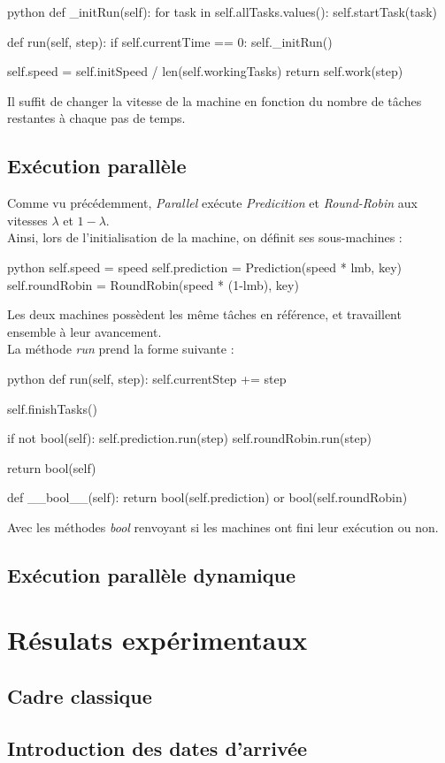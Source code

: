 \documentclass[12pt]{article}
\begin{document}
\begin{mintedbox}{python}
    def _initRun(self):
        for task in self.allTasks.values():
            self.startTask(task)
            
    def run(self, step):
        if self.currentTime == 0:
            self._initRun()

        self.speed = self.initSpeed / len(self.workingTasks)
        return self.work(step)
\end{mintedbox}

Il suffit de changer la vitesse de la machine en fonction du nombre de tâches restantes à chaque pas de temps.

\subsection{Exécution parallèle}

Comme vu précédemment, \emph{Parallel} exécute \emph{Predicition} et \emph{Round-Robin} aux vitesses $\lambda$ et $1 - \lambda$. \\

Ainsi, lors de l'initialisation de la machine, on définit ses sous-machines :
\begin{mintedbox}{python}
        self.speed = speed
        self.prediction = Prediction(speed * lmb, key)
        self.roundRobin = RoundRobin(speed * (1-lmb), key)
\end{mintedbox}

Les deux machines possèdent les même tâches en référence, et travaillent ensemble à leur avancement. \\

La méthode \emph{run} prend la forme suivante :
\begin{mintedbox}{python}
    def run(self, step):
        self.currentStep += step

        self.finishTasks()

        if not bool(self):
            self.prediction.run(step)
            self.roundRobin.run(step)

        return bool(self)
        
    def __bool__(self):
        return bool(self.prediction) or bool(self.roundRobin)
\end{mintedbox}

Avec les méthodes \emph{bool} renvoyant si les machines ont fini leur exécution ou non.

\subsection{Exécution parallèle dynamique}


\newpage
\section{Résulats expérimentaux}
\subsection{Cadre classique}
\subsection{Introduction des dates d'arrivée}
\end{document}
